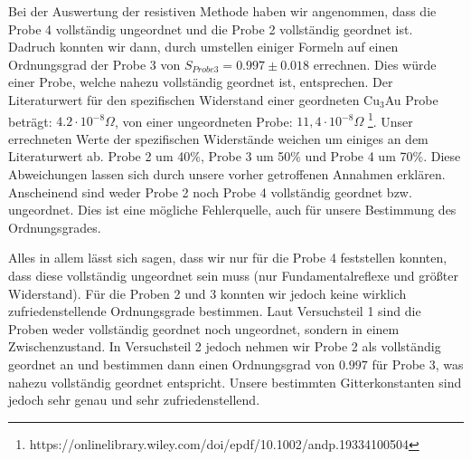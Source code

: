     Bei der Auswertung der resistiven Methode haben wir angenommen, dass die Probe 4 vollständig
    ungeordnet und die Probe 2 vollständig geordnet ist. Dadruch konnten wir dann, durch umstellen einiger Formeln
    auf einen Ordnungsgrad der Probe 3 von $S_{Probe 3} = 0.997 \pm 0.018$ errechnen. 
    Dies würde einer Probe, welche nahezu vollständig geordnet ist, entsprechen. 
    Der Literaturwert für den spezifischen Widerstand einer geordneten Cu$_3$Au Probe beträgt: $4.2 \cdot 10^{-8}\Omega$, von einer ungeordneten
    Probe: $11,4\cdot 10^{-8}\Omega$ \footnote{https://onlinelibrary.wiley.com/doi/epdf/10.1002/andp.19334100504}.
    Unser errechneten Werte der spezifischen Widerstände weichen um einiges an dem Literaturwert ab.
    Probe 2 um 40\%, Probe 3 um 50\% und Probe 4 um 70\%. Diese Abweichungen lassen sich durch 
    unsere vorher getroffenen Annahmen erklären. Anscheinend sind weder Probe 2 noch Probe 4 vollständig geordnet bzw. ungeordnet.
    Dies ist eine mögliche Fehlerquelle, auch für unsere Bestimmung des Ordnungsgrades.
    
    Alles in allem lässt sich sagen, dass wir nur für die Probe 4 feststellen konnten, dass diese vollständig ungeordnet sein muss
    (nur Fundamentalreflexe und größter Widerstand). Für die Proben 2 und 3 konnten wir jedoch keine wirklich zufriedenstellende
    Ordnungsgrade bestimmen. Laut Versuchsteil 1 sind die Proben weder vollständig geordnet noch ungeordnet, sondern in einem
    Zwischenzustand. In Versuchsteil 2 jedoch nehmen wir Probe 2 als vollständig geordnet an und bestimmen
    dann einen Ordnungsgrad von $0.997$ für Probe 3, was nahezu vollständig geordnet entspricht. 
    Unsere bestimmten Gitterkonstanten sind jedoch sehr genau und sehr zufriedenstellend.